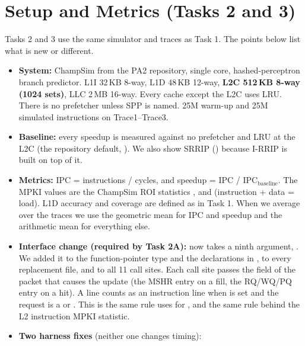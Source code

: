 \clearpage
\section{Setup and Metrics (Tasks 2 and 3)}
Tasks 2 and 3 use the same simulator and traces as Task 1. The points below list what is new or different.

\begin{itemize}
  \item \textbf{System:} ChampSim from the PA2 repository, single core, hashed-perceptron branch predictor.
        L1I 32\,KB 8-way, L1D 48\,KB 12-way, \textbf{L2C 512\,KB 8-way (1024 sets)}, LLC 2\,MB 16-way.
        Every cache except the L2C uses LRU. There is no prefetcher unless SPP is named.
        25M warm-up and 25M simulated instructions on Trace1--Trace3.
  \item \textbf{Baseline:} every speedup is measured against no prefetcher and LRU at the L2C (the repository
        default, ). We also show SRRIP () because I-RRIP is
        built on top of it.
  \item \textbf{Metrics:} IPC = instructions / cycles, and speedup = IPC / IPC$_{\text{baseline}}$. The MPKI values are
        the ChampSim ROI statistics ,  and 
        (instruction + data = load). L1D accuracy and coverage are defined as in Task 1. When we average over the
        traces we use the geometric mean for IPC and speedup and the arithmetic mean for everything else.
  \item \textbf{Interface change (required by Task 2A):}  now takes a ninth argument,
        . We added it to the function-pointer type and the declarations in
        , to every replacement file, and to all 11 call sites. Each call site passes the
         field of the packet that causes the update (the MSHR entry on a fill, the RQ/WQ/PQ entry
        on a hit). A line counts as an instruction line when  is set and the request is a
         or . This is the same rule  uses for ,
        and the same rule behind the L2 instruction MPKI statistic.
  \item \textbf{Two harness fixes} (neither one changes timing):

\end{itemize}

